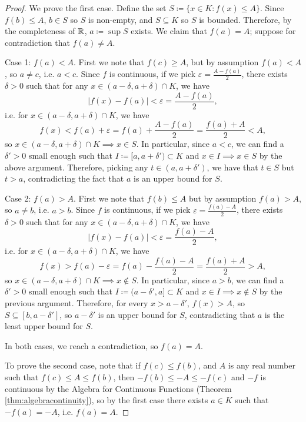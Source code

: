 \documentclass[../analysis1.tex]{subfiles}
\begin{document}
\begin{proof}
    We prove the first case. Define the set $S\coloneqq \{x\in K: f(x)\le A\}$. Since $f(b)\le A$, $b\in S$ so $S$ is non-empty, and $S\subseteq K$ so $S$ is bounded. Therefore, by the completeness of $\mathbb{R}$, $a\coloneqq \sup S$ exists. We claim that $f(a)=A$; suppose for contradiction that $f(a)\ne A$.\par
    Case 1: $f(a)<A$. First we note that $f(c)\ge A$, but by assumption $f(a)<A$, so $a\ne c$, i.e. $a<c$. Since $f$ is continuous, if we pick $\varepsilon=\frac{A-f(a)}{2}$, there exists $\delta>0$ such that for any $x\in (a-\delta,a+\delta)\cap K$, we have \[|f(x)-f(a)|<\varepsilon=\frac{A-f(a)}{2},\]
    i.e. for $x\in (a-\delta,a+\delta)\cap K$, we have
    \[f(x)<f(a)+\varepsilon=f(a)+\frac{A-f(a)}{2}=\frac{f(a)+A}{2}<A,\]
    so $x\in (a-\delta,a+\delta)\cap K\implies x\in S$. In particular, since $a<c$, we can find a $\delta'>0$ small enough such that $I\coloneqq[a,a+\delta')\subset K$ and $x\in I\implies x\in S$ by the above argument. Therefore, picking any $t\in (a,a+\delta')$, we have that $t\in S$ but $t>a$, contradicting the fact that $a$ is an upper bound for $S$.\par
    Case 2: $f(a)>A$. First we note that $f(b)\le A$ but by assumption $f(a)>A$, so $a\ne b$, i.e. $a>b$. Since $f$ is continuous, if we pick $\varepsilon=\frac{f(a)-A}{2}$, there exists $\delta>0$ such that for any $x\in(a-\delta,a+\delta)\cap K$, we have
    \[|f(x)-f(a)|<\varepsilon=\frac{f(a)-A}{2},\]
    i.e. for $x\in(a-\delta,a+\delta)\cap K$, we have
    \[f(x)>f(a)-\varepsilon=f(a)-\frac{f(a)-A}{2}=\frac{f(a)+A}{2}>A,\]
    so $x\in (a-\delta,a+\delta)\cap K\implies x\notin S$. In particular, since $a>b$, we can find a $\delta'>0$ small enough such that $I\coloneqq (a-\delta',a]\subset K$ and $x\in I\implies x\notin S$ by the previous argument. Therefore, for every $x>a-\delta'$, $f(x)>A$, so $S\subseteq[b,a-\delta']$, so $a-\delta'$ is an upper bound for $S$, contradicting that $a$ is the least upper bound for $S$.\par
    In both cases, we reach a contradiction, so $f(a)=A$.\par
    \noindent To prove the second case, note that if $f(c)\le f(b)$, and $A$ is any real number such that $f(c)\le A\le f(b)$, then $-f(b)\le -A\le  -f(c)$ and $-f$ is continuous by the Algebra for Continuous Functions (Theorem \ref{thm:algebracontinuity}), so by the first case there exists $a\in K$ such that $-f(a)=-A$, i.e. $f(a)=A$. \qedhere
\end{proof}
\end{document}
